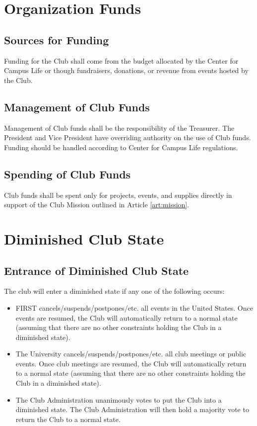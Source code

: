 \documentclass[english,11pt]{article}
\begin{document}
\section{Organization Funds} \label{art:funds}

\subsection{Sources for Funding} \label{sect:funds:sources}
Funding for the Club shall come from the budget allocated by the Center for Campus Life or though fundraisers, donations, or revenue from events hosted by the Club.

\subsection{Management of Club Funds} \label{sect:funds:management}
Management of Club funds shall be the responsibility of the Treasurer.
The President and Vice President have overriding authority on the use of Club funds.
Funding should be handled according to Center for Campus Life regulations.

\subsection{Spending of Club Funds} \label{sect:funds:spending}
Club funds shall be spent only for projects, events, and supplies directly in support of the Club Mission outlined in Article \ref{art:mission}.

\section{Diminished Club State} \label{art:reduced}

\subsection{Entrance of Diminished Club State} \label{sect:reduced:entrance}
The club will enter a diminished state if any one of the following occurs:

\begin{itemize}
    \item FIRST cancels/suspends/postpones/etc. all events in the United States.
        Once events are resumed, the Club will automatically return to a normal state (assuming that there are no other constraints holding the Club in a diminished state).
    \item The University cancels/suspends/postpones/etc. all club meetings or public events.
        Once club meetings are resumed, the Club will automatically return to a normal state (assuming that there are no other constraints holding the Club in a diminished state).
    \item The Club Administration unanimously votes to put the Club into a diminished state.
        The Club Administration will then hold a majority vote to return the Club to a normal state.
\end{itemize}
\end{document}
